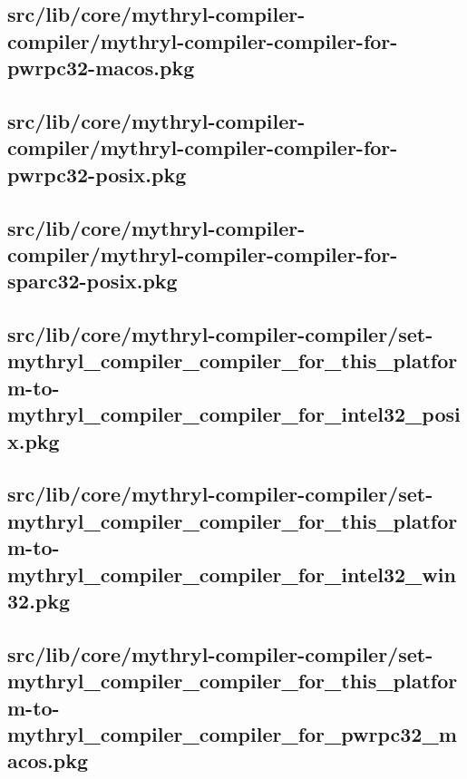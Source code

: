 \subsection{src/lib/core/mythryl-compiler-compiler/mythryl-compiler-compiler-for-pwrpc32-macos.pkg}


\subsection{src/lib/core/mythryl-compiler-compiler/mythryl-compiler-compiler-for-pwrpc32-posix.pkg}


\subsection{src/lib/core/mythryl-compiler-compiler/mythryl-compiler-compiler-for-sparc32-posix.pkg}


\subsection{src/lib/core/mythryl-compiler-compiler/set-mythryl\_compiler\_compiler\_for\_this\_platform-to-mythryl\_compiler\_compiler\_for\_intel32\_posix.pkg}


\subsection{src/lib/core/mythryl-compiler-compiler/set-mythryl\_compiler\_compiler\_for\_this\_platform-to-mythryl\_compiler\_compiler\_for\_intel32\_win32.pkg}


\subsection{src/lib/core/mythryl-compiler-compiler/set-mythryl\_compiler\_compiler\_for\_this\_platform-to-mythryl\_compiler\_compiler\_for\_pwrpc32\_macos.pkg}


